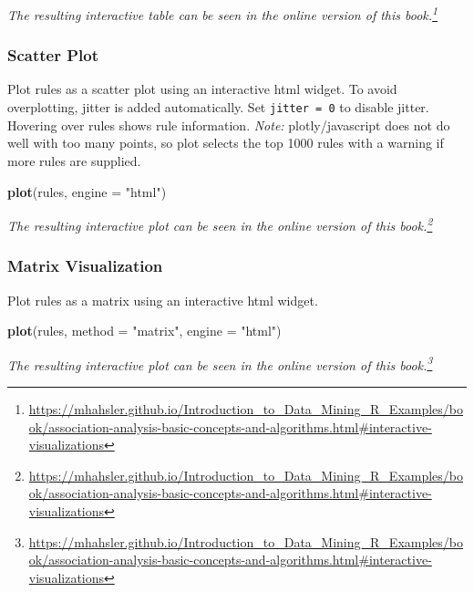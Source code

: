 \documentclass[
  notitlepage]{book}
\newenvironment{Shaded}{\begin{snugshade}}{\end{snugshade}}
\newcommand{\DataTypeTok}[1]{\textcolor[rgb]{0.13,0.29,0.53}{#1}}
\newcommand{\KeywordTok}[1]{\textcolor[rgb]{0.13,0.29,0.53}{\textbf{#1}}}
\newcommand{\NormalTok}[1]{#1}
\newcommand{\StringTok}[1]{\textcolor[rgb]{0.31,0.60,0.02}{#1}}
\DeclareRobustCommand{\href}[2]{#2\footnote{\url{#1}}}
\begin{document}
\emph{The resulting interactive table can be seen in the \href{https://mhahsler.github.io/Introduction_to_Data_Mining_R_Examples/book/association-analysis-basic-concepts-and-algorithms.html\#interactive-visualizations}{online version of this book.}}

\hypertarget{scatter-plot-1}{%
\subsubsection{Scatter Plot}\label{scatter-plot-1}}

Plot rules as a scatter plot using an interactive html widget. To avoid
overplotting, jitter is added automatically. Set \texttt{jitter\ =\ 0} to disable
jitter. Hovering over rules shows rule information. \emph{Note:}
plotly/javascript does not do well with too many points, so plot selects
the top 1000 rules with a warning if more rules are supplied.

\begin{Shaded}
\begin{Highlighting}[]
\KeywordTok{plot}\NormalTok{(rules, }\DataTypeTok{engine =} \StringTok{"html"}\NormalTok{)}
\end{Highlighting}
\end{Shaded}

\emph{The resulting interactive plot can be seen in the \href{https://mhahsler.github.io/Introduction_to_Data_Mining_R_Examples/book/association-analysis-basic-concepts-and-algorithms.html\#interactive-visualizations}{online version of this book.}}

\hypertarget{matrix-visualization-1}{%
\subsubsection{Matrix Visualization}\label{matrix-visualization-1}}

Plot rules as a matrix using an interactive html widget.

\begin{Shaded}
\begin{Highlighting}[]
\KeywordTok{plot}\NormalTok{(rules, }\DataTypeTok{method =} \StringTok{"matrix"}\NormalTok{, }\DataTypeTok{engine =} \StringTok{"html"}\NormalTok{) }
\end{Highlighting}
\end{Shaded}

\emph{The resulting interactive plot can be seen in the \href{https://mhahsler.github.io/Introduction_to_Data_Mining_R_Examples/book/association-analysis-basic-concepts-and-algorithms.html\#interactive-visualizations}{online version of this book.}}
\end{document}
